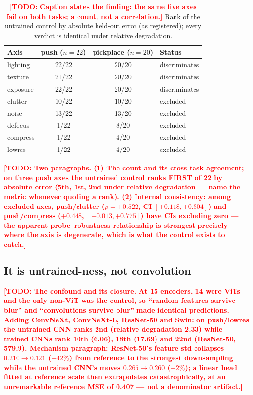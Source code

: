\documentclass[10pt]{article}
\newcommand{\TODO}[1]{\textcolor{red}{\textbf{[TODO: #1]}}}
\newcommand{\reldeg}{relative degradation}
\newcommand{\rrho}{\rho}
\begin{document}
\begin{table}[t]
\centering\small
\caption{\TODO{Caption states the finding: the same five axes fail on both
tasks; a count, not a correlation.} Rank of the untrained control by absolute
held-out error (as registered); every verdict is identical under \reldeg{}.}
\label{tab:e12d}
\begin{tabular}{lccl}
\toprule
Axis & push ($n{=}22$) & pickplace ($n{=}20$) & Status \\
\midrule
lighting & 22/22 & 20/20 & discriminates \\
texture  & 21/22 & 20/20 & discriminates \\
exposure & 22/22 & 20/20 & discriminates \\
clutter  & 10/22 & 10/20 & excluded \\
noise    & 13/22 & 13/20 & excluded \\
defocus  &  1/22 &  8/20 & excluded \\
compress &  1/22 &  4/20 & excluded \\
lowres   &  1/22 &  4/20 & excluded \\
\bottomrule
\end{tabular}
\end{table}

\TODO{Two paragraphs. (1) The count and its cross-task agreement; on three
push axes the untrained control ranks FIRST of 22 by absolute error (5th,
1st, 2nd under \reldeg{} --- name the metric whenever quoting a rank).
(2) Internal consistency: among excluded axes, push/clutter ($\rrho = +0.522$,
CI $[+0.118, +0.804]$) and push/compress ($+0.448$, $[+0.013, +0.775]$) have
CIs excluding zero --- the apparent probe--robustness relationship is
strongest precisely where the axis is degenerate, which is what the control
exists to catch.}

\subsection{It is untrained-ness, not convolution}
\label{sec:mechanism}
\TODO{The confound and its closure. At 15 encoders, 14 were ViTs and the only
non-ViT was the control, so ``random features survive blur'' and
``convolutions survive blur'' made identical predictions. Adding ConvNeXt,
ConvNeXt-L, ResNet-50 and Swin: on push/lowres the untrained CNN ranks 2nd
(\reldeg{} 2.33) while trained CNNs rank 10th (6.06), 18th (17.69) and 22nd
(ResNet-50, 579.9). Mechanism paragraph: ResNet-50's feature std collapses
$0.210 \to 0.121$ ($-42\%$) from reference to the strongest downsampling
while the untrained CNN's moves $0.265 \to 0.260$ ($-2\%$); a linear head
fitted at reference scale then extrapolates catastrophically, at an
unremarkable reference MSE of 0.407 --- not a denominator artifact.}
\end{document}

